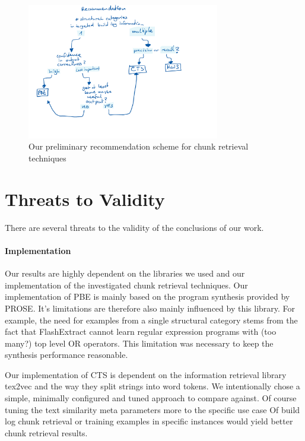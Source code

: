 \documentclass[\myrootdir/main.tex]{subfiles}
\begin{document}
\begin{figure}[htbp]
		\centering
		\includegraphics[width=0.75\textwidth, clip]{img/crt-recommendation.pdf}
		\caption{Our preliminary recommendation scheme for chunk retrieval techniques}
		\label{fig:crt-recommendation}
\end{figure}

\section{Threats to Validity}

There are several threats to the validity of the conclusions of our work.

\paragraph{Implementation}
Our results are highly dependent on the libraries we used and our implementation of the investigated chunk retrieval techniques.
Our implementation of PBE is mainly based on the program synthesis provided by PROSE.
It's limitations are therefore also mainly influenced by this library.
For example, the need for examples from a single structural category stems from the fact that FlashExtract cannot learn regular expression programs with (too many?) top level OR operators.
This limitation was necessary to keep the synthesis performance reasonable.

Our implementation of CTS is dependent on the information retrieval library tex2vec and the way they split strings into word tokens.
We intentionally chose a simple, minimally configured and tuned approach to compare against.
Of course tuning the text similarity meta parameters more to the specific use case Of build log chunk retrieval or training  examples in specific instances would yield better chunk retrieval results.
\end{document}
